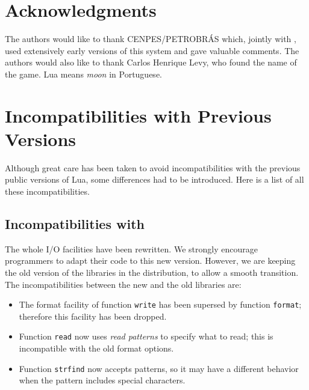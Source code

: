 \section*{Acknowledgments}

The authors would like to thank CENPES/PETROBR\'AS which,
jointly with \tecgraf, used extensively early versions of
this system and gave valuable comments.
The authors would also like to thank Carlos Henrique Levy,
who found the name of the game.
Lua means {\em moon\/} in Portuguese.



\appendix

\section*{Incompatibilities with Previous Versions}

Although great care has been taken to avoid incompatibilities with
the previous public versions of Lua,
some differences had to be introduced.
Here is a list of all these incompatibilities.

\subsection*{Incompatibilities with }
The whole I/O facilities have been rewritten.
We strongly encourage programmers to adapt their code
to this new version.
However, we are keeping the old version of the libraries
in the distribution,
to allow a smooth transition.
The incompatibilities between the new and the old libraries are:
\begin{itemize}
\item The format facility of function \verb'write' has been supersed by
function \verb'format';
therefore this facility has been dropped.
\item Function \verb'read' now uses {\em read patterns\/} to specify
what to read;
this is incompatible with the old format options.
\item Function \verb'strfind' now accepts patterns,
so it may have a different behavior when the pattern includes
special characters.
\end{itemize}

